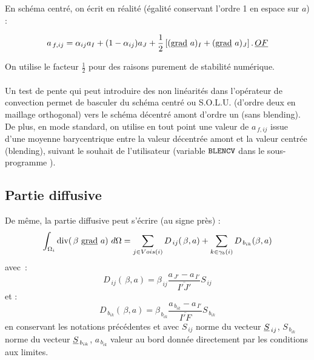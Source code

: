 En sch\'ema centr\'e, on \'ecrit en r\'ealit\'e (\'egalit\'e
conservant l'ordre 1 en espace sur $a$) : 

\begin{equation}\notag
a_{\,f,ij} = \alpha_{ij} a_I +  (1-\alpha_{ij}) a_J  + \displaystyle
\frac{1}{2}\left[(\text{g}\underline{\text{rad}}\  a)_I+(\text{g}\underline{\text{rad}}\  a)_J\right] \text{.}\, \underline{OF}  
\end{equation}

On utilise le facteur $\displaystyle \frac{1}{2}$ pour des raisons purement de stabilit\'e num\'erique.\\\\
Un test de pente qui peut introduire des non lin\'earit\'es dans l'op\'erateur
de convection permet de
basculer du sch\'ema centr\'e ou S.O.L.U. (d'ordre deux en maillage orthogonal)
vers le sch\'ema d\'ecentr\'e amont d'ordre un (sans blending). 
De plus, en mode standard, on utilise en tout point une valeur de 
$a_{\,f,ij}$ issue d'une moyenne barycentrique entre la valeur 
d\'ecentr\'ee amont et la valeur centr\'ee (blending), suivant le souhait de l'utilisateur (variable $\text{\texttt{BLENCV}}$ dans le sous-programme ).


\subsection{\bf Partie diffusive}

De m\^eme, la partie diffusive peut s'\'ecrire (au signe pr\`es) :
\begin{equation}\notag
\int_{\Omega_i}{\text{div}(\,\beta\ \text{g}\underline{\text{rad}}\  a)\  d\Omega} = 
\sum_{j\in Vois(i)}{D_{\,ij}(\,\beta, a)}
+\sum_{k\in {\gamma_b(i)}} {D_{\,{b}_{ik}}(\beta, a)}
\end{equation} 
avec~:
\begin{equation}
D_{\,ij}(\,\beta, a) = \beta_{\,ij}
\frac{a_{\,J'}- a_{\,I'}}{\overline{I'J'}} S_{\,ij} 
\end{equation}
et :
\begin{equation}
D_{\,b_{ik}}(\,\beta, a) = \beta_{\,b_{ik}}
\frac{a_{\,b_{ik}}-a_{\,I'}}{\overline{I'F}} S_{\,b_{ik}} 
\end{equation}
en conservant les notations pr\'ec\'edentes et avec $S_{\,ij}$ norme du vecteur
$\underline{S}_{\,ij}$, $S_{\,b_{ik}}$ norme du vecteur $\underline{S}_{\,b_{ik}}$,
${a_{\,{b}_{ik}}}$ valeur au bord donn\'ee directement par les conditions aux limites.\\
